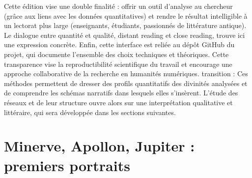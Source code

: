 \documentclass[
  letterpaper,
  DIV=11,
  numbers=noendperiod]{scrreprt}
\begin{document}
Cette édition vise une double finalité : offrir un outil d'analyse au
chercheur (grâce aux liens avec les données quantitatives) et rendre le
résultat intelligible à un lectorat plus large (enseignants, étudiants,
passionnés de littérature antique). Le dialogue entre quantité et
qualité, distant reading et close reading, trouve ici une expression
concrète. Enfin, cette interface est reliée au dépôt GitHub du projet,
qui documente l'ensemble des choix techniques et théoriques. Cette
transparence vise la reproductibilité scientifique du travail et
encourage une approche collaborative de la recherche en humanités
numériques. transition : Ces méthodes permettent de dresser des profils
quantitatifs des divinités analysées et de comprendre les schémas
narratifs dans lesquels elles s'insèrent. L'étude des réseaux et de leur
structure ouvre alors sur une interprétation qualitative et littéraire,
qui sera développée dans les sections suivantes.

\section{Minerve, Apollon, Jupiter : premiers
portraits}\label{minerve-apollon-jupiter-premiers-portraits}
\end{document}
